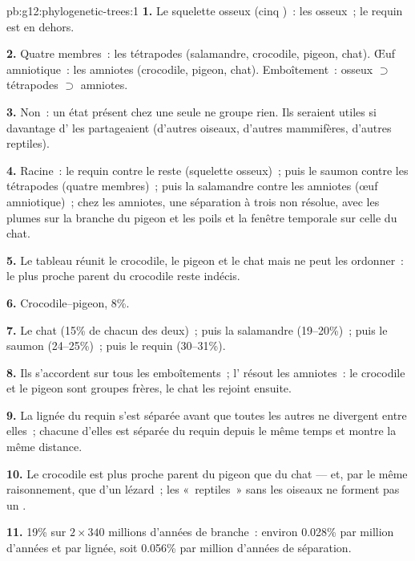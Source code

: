 \begin{solution}{pb:g12:phylogenetic-trees:1}
\textbf{1.} Le squelette osseux (cinq )~: les 
osseux~; le requin est en dehors.

\textbf{2.} Quatre membres~: les tétrapodes (salamandre, crocodile,
pigeon, chat). Œuf amniotique~: les amniotes (crocodile, pigeon,
chat). Emboîtement~:  osseux $\supset$ tétrapodes $\supset$
amniotes.

\textbf{3.} Non~: un état présent chez une seule  ne groupe
rien. Ils seraient utiles si davantage d' les partageaient
(d'autres oiseaux, d'autres mammifères, d'autres reptiles).

\textbf{4.} Racine~: le requin contre le reste (squelette osseux)~;
puis le saumon contre les tétrapodes (quatre membres)~; puis la
salamandre contre les amniotes (œuf amniotique)~; chez les amniotes,
une séparation à trois non résolue, avec les plumes sur la branche du
pigeon et les poils et la fenêtre temporale sur celle du chat.

\textbf{5.} Le tableau réunit le crocodile, le pigeon et le chat mais
ne peut les ordonner~: le plus proche parent du crocodile reste
indécis.

\textbf{6.} Crocodile--pigeon, 8\%.

\textbf{7.} Le chat (15\% de chacun des deux)~; puis la salamandre
(19--20\%)~; puis le saumon (24--25\%)~; puis le requin (30--31\%).

\textbf{8.} Ils s'accordent sur tous les emboîtements~; l' résout
les amniotes~: le crocodile et le pigeon sont groupes frères, le chat
les rejoint ensuite.

\textbf{9.} La lignée du requin s'est séparée avant que toutes les
autres ne divergent entre elles~; chacune d'elles est séparée du
requin depuis le même temps et montre la même distance.

\textbf{10.} Le crocodile est plus proche parent du pigeon que du
chat --- et, par le même raisonnement, que d'un lézard~; les
«~reptiles~» sans les oiseaux ne forment pas un .

\textbf{11.} 19\% sur $2 \times 340$ millions d'années de branche~:
environ 0.028\% par million d'années et par lignée, soit 0.056\% par
million d'années de séparation.


\end{solution}
